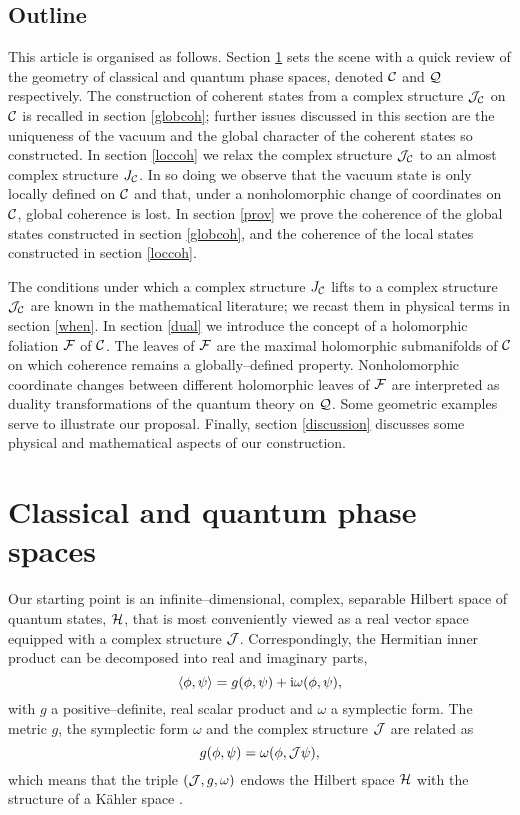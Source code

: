 \documentclass[a4paper,a4paper]{article}
\begin{document}
\subsection{Outline}\label{outline}

This article is organised as follows. Section \ref{clqu} sets the scene 
with a quick review of the geometry of classical and quantum phase spaces, 
denoted  ${\cal C}$ and ${\cal Q}$ respectively. The construction of coherent 
states from a complex structure ${\cal J}_{\cal C}$ on ${\cal C}$ is recalled 
in section \ref{globcoh}; further issues discussed in this section are the 
uniqueness of the vacuum and the global character of the coherent states so constructed. 
In section \ref{loccoh} we relax the complex structure ${\cal J}_{\cal C}$ 
to an almost complex structure $J_{\cal C}$. In so doing we observe that the 
vacuum state is only locally defined on ${\cal C}$ and that, under a nonholomorphic 
change of coordinates on ${\cal C}$, global coherence is lost. In section \ref{prov} 
we prove the coherence of the global states constructed in section \ref{globcoh}, 
and the coherence of the local states constructed in section \ref{loccoh}.

The conditions under which a complex structure $J_{\cal C}$ lifts to a complex 
structure ${\cal J}_{\cal C}$ are known in the mathematical literature; 
we recast them in physical terms in section \ref{when}. In section \ref{dual} 
we introduce the concept of a holomorphic foliation ${\cal F}$ of ${\cal C}$. 
The leaves of ${\cal F}$ are the maximal holomorphic submanifolds of ${\cal C}$ 
on which coherence remains a globally--defined property. Nonholomorphic coordinate 
changes between different holomorphic leaves of ${\cal F}$ are interpreted as duality 
transformations of the quantum theory on ${\cal Q}$. Some geometric examples serve 
to illustrate our proposal. Finally, section \ref{discussion} 
discusses some physical and mathematical aspects of our construction.

\section{Classical and quantum phase spaces}\label{clqu}

Our starting point is an infinite--dimensional, complex, separable Hilbert space 
of quantum states, ${\cal H}$, that is most conveniently viewed as a real vector 
space equipped with a complex structure ${\cal J}$. Correspondingly, 
the Hermitian inner product can be decomposed into real and imaginary parts,
\begin{equation}
\langle\phi,\psi\rangle = g(\phi,\psi) + {\rm i}\omega(\phi,\psi),
\label{dec}
\end{equation}
with $g$ a positive--definite, real scalar product and $\omega$ a symplectic form.
The metric $g$, the symplectic form $\omega$ and the complex structure 
${\cal J}$ are related as
\begin{equation}
g(\phi,\psi)=\omega(\phi,{\cal J}\psi),
\label{kah}
\end{equation}
which means that the triple $({\cal J}, g, \omega)$ endows the Hilbert space 
${\cal H}$ with the structure of a K\"ahler space \cite{KN}. 
\end{document}

